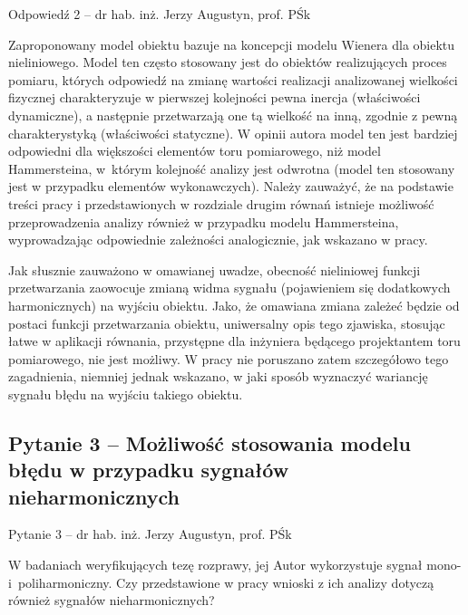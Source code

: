 \documentclass[12pt, polish, aspectratio = 169]{slides}
\begin{document}
\begin{frame}[allowframebreaks]{Odpowiedź 2 -- dr hab. inż. Jerzy Augustyn, prof. PŚk}\small
\begin{justify}
Zaproponowany model obiektu bazuje na koncepcji modelu Wienera dla obiektu nieliniowego. Model ten często stosowany jest do obiektów realizujących proces pomiaru, których odpowiedź na zmianę wartości realizacji analizowanej wielkości fizycznej charakteryzuje w pierwszej kolejności pewna inercja (właściwości dynamiczne), a następnie przetwarzają one tą wielkość na inną, zgodnie z pewną charakterystyką (właściwości statyczne). W opinii autora model ten jest bardziej odpowiedni dla większości elementów toru pomiarowego, niż model Hammersteina, w którym kolejność analizy jest odwrotna (model ten stosowany jest w przypadku elementów wykonawczych). Należy zauważyć, że na podstawie treści pracy i przedstawionych w rozdziale drugim równań istnieje możliwość przeprowadzenia analizy również w przypadku modelu Hammersteina, wyprowadzając odpowiednie zależności analogicznie, jak wskazano w pracy.

Jak słusznie zauważono w omawianej uwadze, obecność nieliniowej funkcji przetwarzania zaowocuje zmianą widma sygnału (pojawieniem się dodatkowych harmonicznych) na wyjściu obiektu. Jako, że omawiana zmiana zależeć będzie od postaci funkcji przetwarzania obiektu, uniwersalny opis tego zjawiska, stosując łatwe w aplikacji równania, przystępne dla inżyniera będącego projektantem toru pomiarowego, nie jest możliwy. W pracy nie poruszano zatem szczegółowo tego zagadnienia, niemniej jednak wskazano, w jaki sposób wyznaczyć wariancję sygnału błędu na wyjściu takiego obiektu.
\end{justify}
\end{frame}

\subsection{Pytanie 3 -- Możliwość stosowania modelu błędu w przypadku sygnałów nieharmonicznych}

\begin{frame}{Pytanie 3 -- dr hab. inż. Jerzy Augustyn, prof. PŚk}\large
\begin{justify}
W badaniach weryfikujących tezę rozprawy, jej Autor wykorzystuje sygnał mono- i poliharmoniczny. Czy przedstawione w pracy wnioski z ich analizy dotyczą również sygnałów nieharmonicznych?
\end{justify}
\end{frame}
\end{document}
